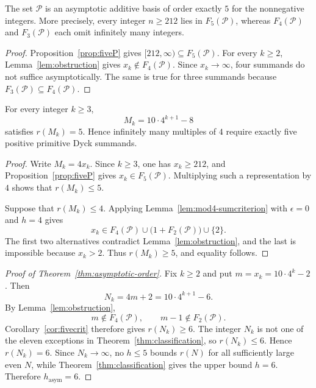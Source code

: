 \documentclass{ws-ijfcs}
\newcommand{\Pset}{\mathcal P}
\begin{document}
\begin{corollary}[Order of $\Pset$]\label{cor:orderfive}
The set $\Pset$ is an asymptotic additive basis of order exactly $5$ for
the nonnegative integers.  More precisely, every integer $n\geq212$ lies
in $F_5(\Pset)$, whereas $F_4(\Pset)$ and $F_3(\Pset)$ each omit
infinitely many integers.
\end{corollary}

\begin{proof}
Proposition~\ref{prop:fiveP} gives
$[212,\infty)\subseteq F_5(\Pset)$.  For every $k\geq2$,
Lemma~\ref{lem:obstruction} gives $x_k\notin F_4(\Pset)$.  Since
$x_k\to\infty$, four summands do not suffice asymptotically.  The same is
true for three summands because $F_3(\Pset)\subseteq F_4(\Pset)$.
\end{proof}

\begin{corollary}
\label{cor:five-multiples}
For every integer $k\geq3$,
\[
 M_k=10\cdot4^{k+1}-8
\]
satisfies $r(M_k)=5$.  Hence infinitely many multiples of $4$ require
exactly five positive primitive Dyck summands.
\end{corollary}

\begin{proof}
Write $M_k=4x_k$.  Since $k\geq3$, one has $x_k\geq212$, and
Proposition~\ref{prop:fiveP} gives $x_k\in F_5(\Pset)$.  Multiplying such
a representation by $4$ shows that $r(M_k)\leq5$.

Suppose that $r(M_k)\leq4$.  Applying
Lemma~\ref{lem:mod4-sumcriterion} with $\epsilon=0$ and $h=4$ gives
\[
 x_k\in
 F_4(\Pset)
 \cup\bigl(1+F_2(\Pset)\bigr)
 \cup\{2\}.
\]
The first two alternatives contradict Lemma~\ref{lem:obstruction}, and
the last is impossible because $x_k>2$.  Thus $r(M_k)\geq5$, and equality
follows.
\end{proof}

\begin{proof}[Proof of Theorem~\ref{thm:asymptotic-order}]
Fix $k\geq2$ and put $m=x_k=10\cdot4^k-2$.  Then
\[
 N_k=4m+2=10\cdot4^{k+1}-6.
\]
By Lemma~\ref{lem:obstruction},
\[
 m\notin F_4(\Pset),
 \qquad
 m-1\notin F_2(\Pset).
\]
Corollary~\ref{cor:fivecrit} therefore gives $r(N_k)\geq6$.  The integer
$N_k$ is not one of the eleven exceptions in
Theorem~\ref{thm:classification}, so $r(N_k)\leq6$.  Hence $r(N_k)=6$.
Since $N_k\to\infty$, no $h\leq5$ bounds $r(N)$ for all sufficiently
large even $N$, while Theorem~\ref{thm:classification} gives the upper
bound $h=6$.  Therefore $h_{\mathrm{asym}}=6$.
\end{proof}
\end{document}
